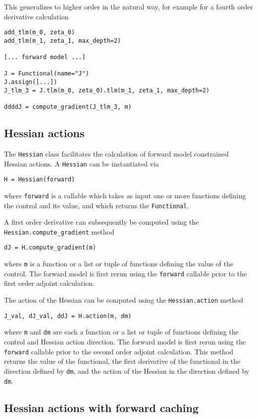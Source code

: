 \documentclass[11pt]{article}
\begin{document}
This generalizes to higher order in the natural way, for example for a fourth
order derivative calculation
\begin{lstlisting}
add_tlm(m_0, zeta_0)
add_tlm(m_1, zeta_1, max_depth=2)

[... forward model ...]

J = Functional(name="J")
J.assign([...])
J_tlm_3 = J.tlm(m_0, zeta_0).tlm(m_1, zeta_1, max_depth=2)

ddddJ = compute_gradient(J_tlm_3, m)
\end{lstlisting}

\subsection{Hessian actions}\label{sect:Hessian}

The \texttt{Hessian} class facilitates the calculation of forward model
constrained Hessian actions. A \texttt{Hessian} can be instantiated via
\begin{lstlisting}
H = Hessian(forward)
\end{lstlisting}
where \texttt{forward} is a callable which takes as input one or more functions
defining the control and its value, and which returns the \texttt{Functional}.

A first order derivative can subsequently be computed using the
\texttt{Hessian.compute\_gradient} method
\begin{lstlisting}
dJ = H.compute_gradient(m)
\end{lstlisting}
where \texttt{m} is a function or a list or tuple of functions defining the
value of the control. The forward model is first rerun using the
\texttt{forward} callable prior to the first order adjoint calculation.

The action of the Hessian can be computed using the \texttt{Hessian.action}
method
\begin{lstlisting}
J_val, dJ_val, ddJ = H.action(m, dm)
\end{lstlisting}
where \texttt{m} and \texttt{dm} are each a function or a list or tuple of
functions defining the control and Hessian action direction. The forward model
is first rerun using the \texttt{forward} callable prior to the second order
adjoint calculation. This method returns the value of the functional, the first
derivative of the functional in the direction defined by \texttt{dm}, and the
action of the Hessian in the direction defined by \texttt{dm}.

\subsection{Hessian actions with forward caching}
\end{document}
